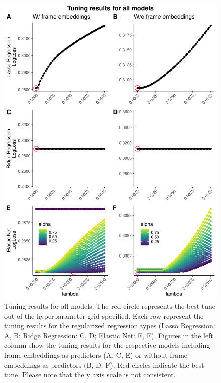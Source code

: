 \documentclass[
  man]{apa6}
\begin{document}
\begin{figure}
\includegraphics[width=0.9\linewidth]{FinalReport_files/figure-latex/tuning-1} \caption{Tuning results for all models. The red circle represents the best tune out of the hyperparameter grid specified. Each row represent the tuning results for the regularized regression types (Lasso Regression: A, B; Ridge Regression: C, D; Elastic Net: E, F). Figures in the left column show the tuning results for the respective models including frame embeddings as predictors (A, C, E) or without frame embeddings as predictors (B, D, F). Red circles indicate the best tune. Please note that the y axis scale is not consistent.}\label{fig:tuning}
\end{figure}
\end{document}

